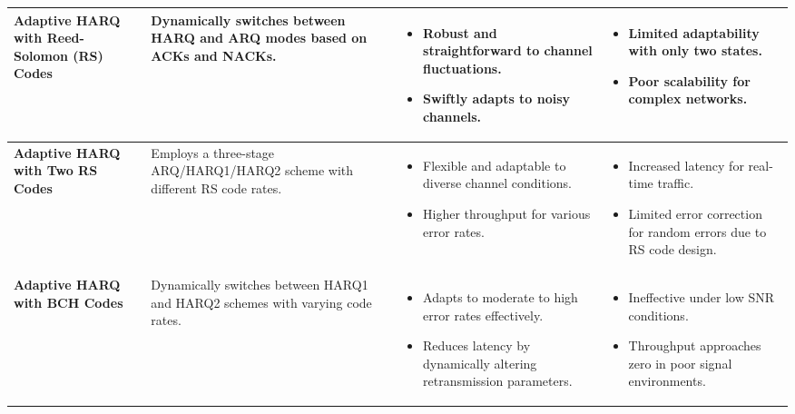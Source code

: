 \documentclass[a4paper,10pt]{article}
\begin{document}
\begin{enumerate}
\begin{longtable}{|>{\centering\arraybackslash}m{3.2cm}|>{\centering\arraybackslash}m{4.3cm}|>{\centering\arraybackslash}m{3.75cm}|>{\centering\arraybackslash}m{3.75cm}|}
\textbf{Adaptive HARQ with Reed-Solomon (RS) Codes} & Dynamically switches between HARQ and ARQ modes based on ACKs and NACKs. & 
\begin{itemize}
    \item Robust and straightforward to channel fluctuations.
    \item Swiftly adapts to noisy channels.
\end{itemize} & 
\begin{itemize}
    \item Limited adaptability with only two states.
    \item Poor scalability for complex networks.
\end{itemize} \\ 
\hline

\textbf{Adaptive HARQ with Two RS Codes} & Employs a three-stage ARQ/HARQ1/HARQ2 scheme with different RS code rates. & 
\begin{itemize}
    \item Flexible and adaptable to diverse channel conditions.
    \item Higher throughput for various error rates.
\end{itemize} & 
\begin{itemize}
    \item Increased latency for real-time traffic.
    \item Limited error correction for random errors due to RS code design.
\end{itemize} \\ 
\hline

\textbf{Adaptive HARQ with BCH Codes} & Dynamically switches between HARQ1 and HARQ2 schemes with varying code rates. & 
\begin{itemize}
    \item Adapts to moderate to high error rates effectively.
    \item Reduces latency by dynamically altering retransmission parameters.
\end{itemize} & 
\begin{itemize}
    \item Ineffective under low SNR conditions.
    \item Throughput approaches zero in poor signal environments.
\end{itemize} \\ 
\hline


\end{longtable}
\end{enumerate}
\end{document}
